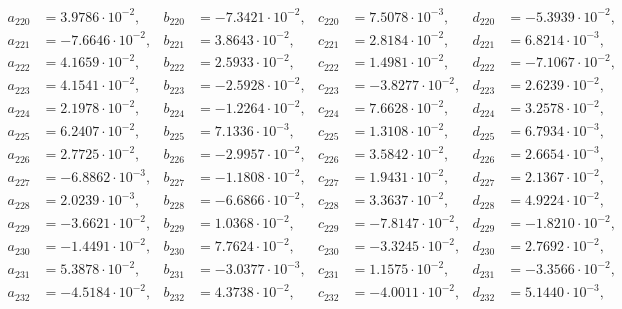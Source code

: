 \begin{align*}
  a_{ 220 } &= 3.9786 \cdot 10^{ -2 }, & b_{ 220 } &= -7.3421 \cdot 10^{ -2 }, & c_{ 220 } &= 7.5078 \cdot 10^{ -3 }, & d_{ 220 } &= -5.3939 \cdot 10^{ -2 }, \\ 
  a_{ 221 } &= -7.6646 \cdot 10^{ -2 }, & b_{ 221 } &= 3.8643 \cdot 10^{ -2 }, & c_{ 221 } &= 2.8184 \cdot 10^{ -2 }, & d_{ 221 } &= 6.8214 \cdot 10^{ -3 }, \\ 
  a_{ 222 } &= 4.1659 \cdot 10^{ -2 }, & b_{ 222 } &= 2.5933 \cdot 10^{ -2 }, & c_{ 222 } &= 1.4981 \cdot 10^{ -2 }, & d_{ 222 } &= -7.1067 \cdot 10^{ -2 }, \\ 
  a_{ 223 } &= 4.1541 \cdot 10^{ -2 }, & b_{ 223 } &= -2.5928 \cdot 10^{ -2 }, & c_{ 223 } &= -3.8277 \cdot 10^{ -2 }, & d_{ 223 } &= 2.6239 \cdot 10^{ -2 }, \\ 
  a_{ 224 } &= 2.1978 \cdot 10^{ -2 }, & b_{ 224 } &= -1.2264 \cdot 10^{ -2 }, & c_{ 224 } &= 7.6628 \cdot 10^{ -2 }, & d_{ 224 } &= 3.2578 \cdot 10^{ -2 }, \\ 
  a_{ 225 } &= 6.2407 \cdot 10^{ -2 }, & b_{ 225 } &= 7.1336 \cdot 10^{ -3 }, & c_{ 225 } &= 1.3108 \cdot 10^{ -2 }, & d_{ 225 } &= 6.7934 \cdot 10^{ -3 }, \\ 
  a_{ 226 } &= 2.7725 \cdot 10^{ -2 }, & b_{ 226 } &= -2.9957 \cdot 10^{ -2 }, & c_{ 226 } &= 3.5842 \cdot 10^{ -2 }, & d_{ 226 } &= 2.6654 \cdot 10^{ -3 }, \\ 
  a_{ 227 } &= -6.8862 \cdot 10^{ -3 }, & b_{ 227 } &= -1.1808 \cdot 10^{ -2 }, & c_{ 227 } &= 1.9431 \cdot 10^{ -2 }, & d_{ 227 } &= 2.1367 \cdot 10^{ -2 }, \\ 
  a_{ 228 } &= 2.0239 \cdot 10^{ -3 }, & b_{ 228 } &= -6.6866 \cdot 10^{ -2 }, & c_{ 228 } &= 3.3637 \cdot 10^{ -2 }, & d_{ 228 } &= 4.9224 \cdot 10^{ -2 }, \\ 
  a_{ 229 } &= -3.6621 \cdot 10^{ -2 }, & b_{ 229 } &= 1.0368 \cdot 10^{ -2 }, & c_{ 229 } &= -7.8147 \cdot 10^{ -2 }, & d_{ 229 } &= -1.8210 \cdot 10^{ -2 }, \\ 
  a_{ 230 } &= -1.4491 \cdot 10^{ -2 }, & b_{ 230 } &= 7.7624 \cdot 10^{ -2 }, & c_{ 230 } &= -3.3245 \cdot 10^{ -2 }, & d_{ 230 } &= 2.7692 \cdot 10^{ -2 }, \\ 
  a_{ 231 } &= 5.3878 \cdot 10^{ -2 }, & b_{ 231 } &= -3.0377 \cdot 10^{ -3 }, & c_{ 231 } &= 1.1575 \cdot 10^{ -2 }, & d_{ 231 } &= -3.3566 \cdot 10^{ -2 }, \\ 
  a_{ 232 } &= -4.5184 \cdot 10^{ -2 }, & b_{ 232 } &= 4.3738 \cdot 10^{ -2 }, & c_{ 232 } &= -4.0011 \cdot 10^{ -2 }, & d_{ 232 } &= 5.1440 \cdot 10^{ -3 }, \\ 

\end{align*}
